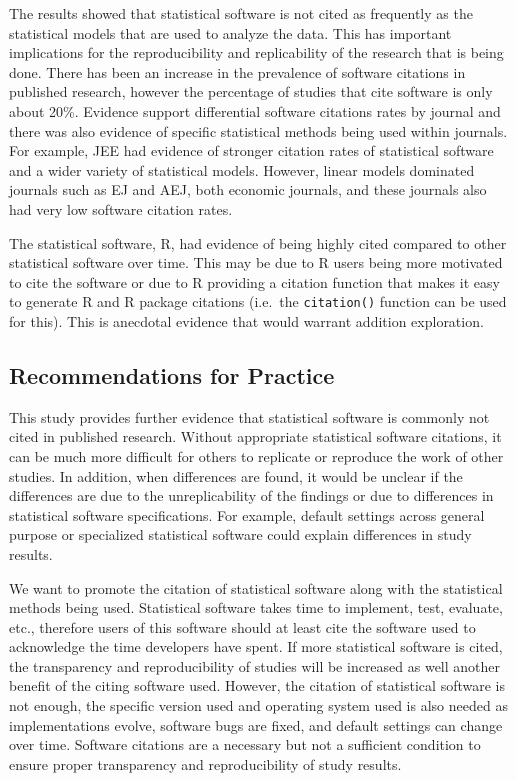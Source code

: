 \documentclass[
  english,
  ,man]{apa6}
\begin{document}
The results showed that statistical software is not cited as frequently as the statistical models that are used to analyze the data. This has important implications for the reproducibility and replicability of the research that is being done. There has been an increase in the prevalence of software citations in published research, however the percentage of studies that cite software is only about 20\%. Evidence support differential software citations rates by journal and there was also evidence of specific statistical methods being used within journals. For example, JEE had evidence of stronger citation rates of statistical software and a wider variety of statistical models. However, linear models dominated journals such as EJ and AEJ, both economic journals, and these journals also had very low software citation rates.

The statistical software, R, had evidence of being highly cited compared to other statistical software over time. This may be due to R users being more motivated to cite the software or due to R providing a citation function that makes it easy to generate R and R package citations (i.e.~the \texttt{citation()} function can be used for this). This is anecdotal evidence that would warrant addition exploration.

\hypertarget{recommendations-for-practice}{%
\subsection{Recommendations for Practice}\label{recommendations-for-practice}}

This study provides further evidence that statistical software is commonly not cited in published research. Without appropriate statistical software citations, it can be much more difficult for others to replicate or reproduce the work of other studies. In addition, when differences are found, it would be unclear if the differences are due to the unreplicability of the findings or due to differences in statistical software specifications. For example, default settings across general purpose or specialized statistical software could explain differences in study results.

We want to promote the citation of statistical software along with the statistical methods being used. Statistical software takes time to implement, test, evaluate, etc., therefore users of this software should at least cite the software used to acknowledge the time developers have spent. If more statistical software is cited, the transparency and reproducibility of studies will be increased as well another benefit of the citing software used. However, the citation of statistical software is not enough, the specific version used and operating system used is also needed as implementations evolve, software bugs are fixed, and default settings can change over time. Software citations are a necessary but not a sufficient condition to ensure proper transparency and reproducibility of study results.
\end{document}
